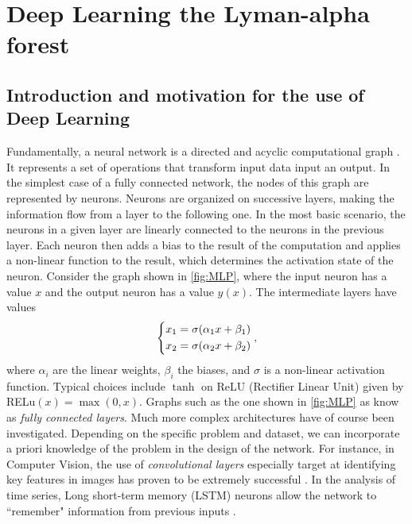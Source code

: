 \chapter{Deep Learning the Lyman-alpha forest}
\label{chap: deep learning}




\section{Introduction and motivation for the use of Deep Learning}
\label{sec:motiv_ml}


Fundamentally, a neural network is a directed and acyclic computational graph \cite{LeCun2015}. It represents a set of operations that transform input data input an output. In the simplest case of a fully connected network, the nodes of this graph are represented by neurons. Neurons are organized on successive layers, making the information flow from a layer to the following one. In the most basic scenario, the neurons in a given layer are linearly connected to the neurons in the previous layer. Each neuron then adds a bias to the result of the computation and applies a non-linear function to the result, which determines the activation state of the neuron. Consider the graph shown in \cref{fig:MLP}, where the input neuron has a value $x$ and the output neuron has a value $y(x)$. The intermediate layers have values
\begin{equation}
    \begin{dcases}
        x_1=\sigma(\alpha_1 x+\beta_1)\\
        x_2=\sigma(\alpha_2 x+\beta_2)
    \end{dcases},
\end{equation}
where $\alpha_i$ are the linear weights, $\beta_i$ the biases, and $\sigma$ is a non-linear activation function. Typical choices include $\tanh{}$ on ReLU (Rectifier Linear Unit) given by RELu$(x)=\max(0,x)$. Graphs such as the one shown in \cref{fig:MLP} as know as \emph{fully connected layers}. Much more complex architectures have of course been investigated. Depending on the specific problem and dataset, we can incorporate a priori knowledge of the problem in the design of the network. For instance, in Computer Vision, the use of \emph{convolutional layers} especially target at identifying key features in images has proven to be extremely successful \cite{CNN_rev}. In the analysis of time series, Long short-term memory (LSTM) neurons allow the network to ``remember" information from previous inputs \cite{LSTM_rev}. 




